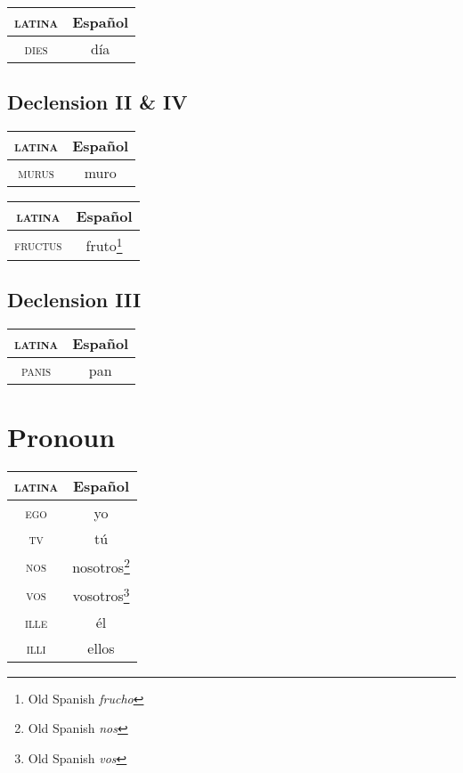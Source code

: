 \documentclass{report}
\begin{document}
\begin{tabular}{|c|c|}
  \hline
  \textsc{latina} & Español \\
  \hline
  \textsc{dies} & día \\
  \hline
\end{tabular}

\subsection{Declension II \& IV}

\begin{tabular}{|c|c|}
  \hline
  \textsc{latina} & Español \\
  \hline
  \textsc{murus} & muro \\
  \hline
\end{tabular}

\begin{tabular}{|c|c|}
  \hline
  \textsc{latina} & Español \\
  \hline
  \textsc{fructus} & fruto\footnote{Old Spanish \emph{frucho}} \\
  \hline
\end{tabular}

\subsection{Declension III}

\begin{tabular}{|c|c|}
  \hline
  \textsc{latina} & Español \\
  \hline
  \textsc{panis} & pan \\
  \hline
\end{tabular}

\section{Pronoun}

\begin{tabular}{|c|c|}
  \hline
  \textsc{latina} & Español \\
  \hline
  \textsc{ego} & yo \\
  \hline
  \textsc{tv} & tú \\
  \hline
  \textsc{nos} & nosotros\footnote{Old Spanish \emph{nos}} \\
  \hline
  \textsc{vos} & vosotros\footnote{Old Spanish \emph{vos}} \\
  \hline
  \textsc{ille} & él \\
  \hline
  \textsc{illi} & ellos \\
  \hline
\end{tabular}
\end{document}
